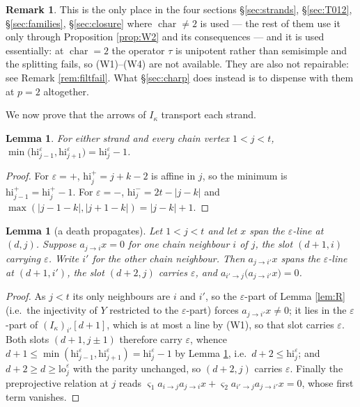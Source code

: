 \documentclass[reqno]{amsart}
\theoremstyle{plain}
\newtheorem{lemma}[theorem]{Lemma}
\theoremstyle{definition}
\newtheorem{remark}[theorem]{Remark}
\newcommand{\ka}{\kappa}
\newcommand{\eps}{\varepsilon}
\newcommand{\hi}{\mathrm{hi}}
\newcommand{\lo}{\mathrm{lo}}
\begin{document}
\begin{remark}\label{rem:char2}
This is the only place in the four sections \S\ref{sec:strands},
\S\ref{sec:T012}, \S\ref{sec:families}, \S\ref{sec:closure} where
$\operatorname{char}\ne2$ is used --- the rest of them use it only through
Proposition \ref{prop:W2} and its consequences --- and it is used essentially: at $\operatorname{char}=2$ the operator $\tau$ is unipotent rather
than semisimple and the splitting fails, so (W1)--(W4) are not available.  They
are also not repairable: see Remark \ref{rem:filtfail}.  What
\S\ref{sec:charp} does instead is to dispense with them at $p=2$ altogether.
\end{remark}

We now prove that the arrows of $I_\ka$ transport each strand.

\begin{lemma}\label{lem:hi}
For either strand and every chain vertex $1<j<t$,
$\min\bigl(\hi^{\eps}_{j-1},\hi^{\eps}_{j+1}\bigr)=\hi^{\eps}_j-1$.
\end{lemma}

\begin{proof}
For $\eps=+$, $\hi^{+}_j=j+k-2$ is affine in $j$, so the minimum is
$\hi^+_{j-1}=\hi^+_j-1$.  For $\eps=-$, $\hi^-_j=2t-|j-k|$ and
$\max(|j-1-k|,|j+1-k|)=|j-k|+1$.
\end{proof}

\begin{lemma}[a death propagates]\label{lem:death}
Let $1<j<t$ and let $x$ span the $\eps$-line at $(d,j)$.  Suppose
$a_{j\to i}x=0$ for one chain neighbour $i$ of $j$, the slot $(d+1,i)$ carrying
$\eps$.  Write $i'$ for the other chain neighbour.  Then $a_{j\to i'}x$ spans
the $\eps$-line at $(d+1,i')$, the slot $(d+2,j)$ carries $\eps$, and
$a_{i'\to j}\bigl(a_{j\to i'}x\bigr)=0$.
\end{lemma}

\begin{proof}
As $j<t$ its only neighbours are $i$ and $i'$, so the $\eps$-part of Lemma
\ref{lem:R} (i.e.\ the injectivity of $Y$ restricted to the $\eps$-part) forces
$a_{j\to i'}x\ne0$; it lies in the $\eps$-part of $(I_\ka)_{i'}[d+1]$, which is
at most a line by (W1), so that slot carries $\eps$.  Both slots $(d+1,j\pm1)$
therefore carry $\eps$, whence
$d+1\le\min(\hi^{\eps}_{j-1},\hi^{\eps}_{j+1})=\hi^{\eps}_j-1$ by Lemma
\ref{lem:hi}, i.e.\ $d+2\le\hi^{\eps}_j$; and $d+2\ge d\ge\lo^{\eps}_j$ with
the parity unchanged, so $(d+2,j)$ carries $\eps$.  Finally the preprojective
relation at $j$ reads
$\varsigma_1a_{i\to j}a_{j\to i}x+\varsigma_2a_{i'\to j}a_{j\to i'}x=0$, whose first term
vanishes.
\end{proof}
\end{document}
